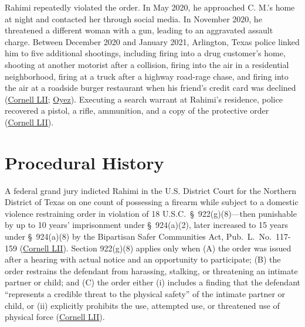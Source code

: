 \documentclass[12pt]{article}
\begin{document}
Rahimi repeatedly violated the order. In May 2020, he approached C. M.'s home at night and contacted her through social media. In November 2020, he threatened a different woman with a gun, leading to an aggravated assault charge. Between December 2020 and January 2021, Arlington, Texas police linked him to five additional shootings, including firing into a drug customer's home, shooting at another motorist after a collision, firing into the air in a residential neighborhood, firing at a truck after a highway road-rage chase, and firing into the air at a roadside burger restaurant when his friend's credit card was declined (\href{https://www.law.cornell.edu/supremecourt/text/22-915}{Cornell LII}; \href{https://www.oyez.org/cases/2023/22-915}{Oyez}). Executing a search warrant at Rahimi's residence, police recovered a pistol, a rifle, ammunition, and a copy of the protective order (\href{https://www.law.cornell.edu/supremecourt/text/22-915}{Cornell LII}).

\section{Procedural History}

A federal grand jury indicted Rahimi in the U.S. District Court for the Northern District of Texas on one count of possessing a firearm while subject to a domestic violence restraining order in violation of 18 U.S.C.\ \S\ 922(g)(8)---then punishable by up to 10 years' imprisonment under \S\ 924(a)(2), later increased to 15 years under \S\ 924(a)(8) by the Bipartisan Safer Communities Act, Pub.\ L.\ No.\ 117-159 (\href{https://www.law.cornell.edu/supremecourt/text/22-915}{Cornell LII}). Section 922(g)(8) applies only when (A) the order was issued after a hearing with actual notice and an opportunity to participate; (B) the order restrains the defendant from harassing, stalking, or threatening an intimate partner or child; and (C) the order either (i) includes a finding that the defendant ``represents a credible threat to the physical safety'' of the intimate partner or child, or (ii) explicitly prohibits the use, attempted use, or threatened use of physical force (\href{https://www.law.cornell.edu/supremecourt/text/22-915}{Cornell LII}).
\end{document}
